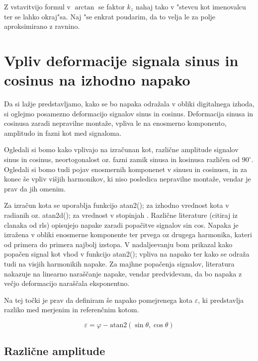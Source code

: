 Z vstavitvijo formul v $\arctan$ se faktor $k_z$ nahaj tako v "stevcu kot imenovalcu ter se lahko okraj"sa. Naj "se  enkrat poudarim, da to velja le za polje aproksimirano z ravnino.



\chapter{Vpliv deformacije signala sinus in cosinus na izhodno napako}

Da si lažje predstavljamo, kako se bo napaka odražala v obliki digitalnega izhoda, si oglejmo posamezno deformacijo signalov sinus in cosinus. Deformacija sinusa in cosinusa zaradi nepravilne montaže, vpliva le na enosmerno komponento, amplitudo in fazni kot med signaloma.

Ogledali si bomo kako vplivajo na izračunan kot, različne amplitude signalov sinus in cosinus, neortogonalost oz. fazni zamik sinusa in kosinusa različen od $90^\circ$. Ogledali si bomo tudi pojav enosmernih komponenet v sinusu in cosinusu, in za konec še vpliv višjih harmonikov, ki niso posledica nepravilne montaže, vendar je prav da jih omenim.

Za izračun kota se uporablja funkcijo atan2(); za izhodno vrednost kota v radianih oz. atan2d(); za vrednost v stopinjah \cite{atan2Matlab}\cite{atan2dMatlab}. Različne literature (citiraj iz clanaka od rls) opisujejo napake zaradi popačitve signalov sin cos. Napaka je izražena v obliki enosmerne komponente ter prvega oz drugega harmonika, kateri od primera do primera najbolj izstopa. V nadaljeevanju bom prikazal kako popačen signal kot vhod v funkcijo atan2(); vpliva na napako ter kako se odraža tudi na visjih harmonikih napake. Za majhne popačenja signalov, literatura nakazuje na linearno naraščanje napake, vendar predvidevam, da bo napaka z večjo deformacijo naraščala eksponentno.

Na tej točki je prav da definiram še napako pomejrenega kota $\varepsilon$, ki predstavlja razliko med merjenim in referenčnim kotom.

\begin{equation}
\varepsilon = \varphi - \mathrm{atan2}(\sin{\theta},\cos{\theta})
\end{equation}


\section{Različne amplitude}

